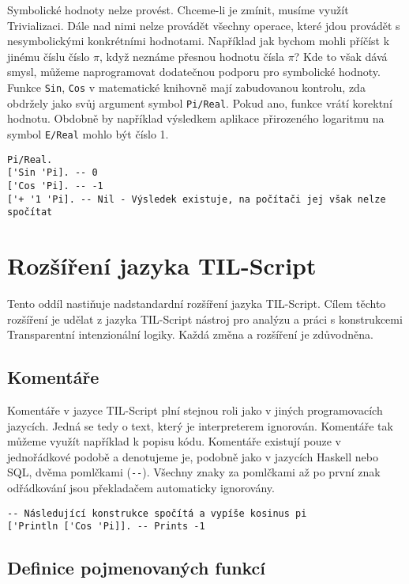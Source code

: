 Symbolické hodnoty nelze provést. Chceme-li je zmínit, musíme využít Trivializaci. Dále nad nimi
nelze provádět všechny operace, které jdou provádět s nesymbolickými konkrétními hodnotami.
Například jak bychom mohli příčíst k jinému číslu číslo $\pi$, když neznáme přesnou hodnotu čísla
$\pi$? Kde to však dává smysl, můžeme naprogramovat dodatečnou podporu pro symbolické hodnoty.
Funkce \lstinline{Sin}, \lstinline{Cos} v matematické knihovně mají zabudovanou kontrolu, zda
obdržely jako svůj argument symbol \lstinline{Pi/Real}. Pokud ano, funkce vrátí korektní
hodnotu. Obdobně by například výsledkem aplikace přirozeného logaritmu na symbol \lstinline{E/Real}
mohlo být číslo 1.

\begin{lstlisting}[caption={Příklad využití symbolických hodnot}]
Pi/Real.
['Sin 'Pi]. -- 0
['Cos 'Pi]. -- -1
['+ '1 'Pi]. -- Nil - Výsledek existuje, na počítači jej však nelze spočítat
\end{lstlisting}

\section{Rozšíření jazyka TIL-Script}

Tento oddíl nastiňuje nadstandardní rozšíření jazyka TIL-Script. Cílem těchto rozšíření je udělat
z jazyka TIL-Script nástroj pro analýzu a práci s konstrukcemi Transparentní intenzionální logiky.
Každá změna a rozšíření je zdůvodněna.

\subsection{Komentáře}

Komentáře v jazyce TIL-Script plní stejnou roli jako v jiných programovacích jazycích. Jedná se tedy
o text, který je interpreterem ignorován. Komentáře tak můžeme využít například k popisu kódu.
Komentáře existují pouze v jednořádkové podobě a denotujeme je, podobně jako v jazycích Haskell
nebo SQL, dvěma pomlčkami (\lstinline{--}). Všechny znaky za pomlčkami až po první znak odřádkování
jsou překladačem automaticky ignorovány.

\begin{lstlisting}[caption={Příklad využití komentářů}]
-- Následující konstrukce spočítá a vypíše kosinus pi
['Println ['Cos 'Pi]]. -- Prints -1
\end{lstlisting}

\subsection{Definice pojmenovaných funkcí}\label{fn-definition}


